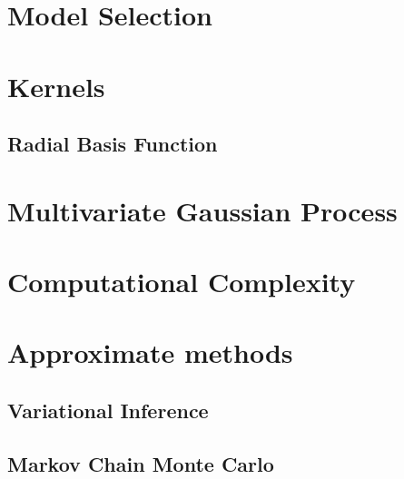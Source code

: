 \section{Model Selection}
\section{Kernels}\label{sec:kernels}

\subsection{Radial Basis Function}\label{sec:kernels_rbf}
\section{Multivariate Gaussian Process}
\section{Computational Complexity}
\section{Approximate methods}
\subsection{Variational Inference}
\subsection{Markov Chain Monte Carlo}
